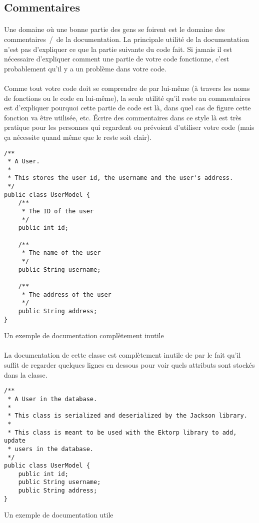 \subsection{Commentaires}

\paragraph{} Une domaine où une bonne partie des gens se foirent est le domaine
des commentaires~/~de la documentation. La principale utilité de la
documentation n'est pas d'expliquer ce que la partie suivante du code fait. Si
jamais il est nécessaire d'expliquer comment une partie de votre code
fonctionne, c'est probablement qu'il y a un problème dans votre code.

\paragraph{} Comme tout votre code doit se comprendre de par lui-même (à
travers les noms de fonctions ou le code en lui-même), la seule utilité qu'il
reste au commentaires est d'expliquer pourquoi cette partie de code est là,
dans quel cas de figure cette fonction va être utilisée, etc. Écrire des
commentaires dans ce style là est très pratique pour les personnes qui
regardent ou prévoient d'utiliser votre code (mais ça nécessite quand même que
le reste soit clair).

\begin{listing}[H]
	\centering
	\begin{verbatim}
/**
 * A User.
 *
 * This stores the user id, the username and the user's address.
 */
public class UserModel {
	/**
	 * The ID of the user
	 */
	public int id;

	/**
	 * The name of the user
	 */
	public String username;

	/**
	 * The address of the user
	 */
	public String address;
}
	\end{verbatim}
	\caption{Un exemple de documentation complètement inutile}
\end{listing}

\paragraph{} La documentation de cette classe est complètement inutile de par
le fait qu'il suffit de regarder quelques lignes en dessous pour voir quels
attributs sont stockés dans la classe.

\begin{listing}[H]
	\centering
	\begin{verbatim}
/**
 * A User in the database.
 *
 * This class is serialized and deserialized by the Jackson library.
 *
 * This class is meant to be used with the Ektorp library to add, update
 * users in the database.
 */
public class UserModel {
	public int id;
	public String username;
	public String address;
}
	\end{verbatim}
	\caption{Un exemple de documentation utile}
\end{listing}
